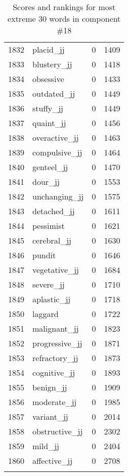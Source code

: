 \begin{longtable}[!htbp]{| rlr@{.}l |}
    1832 & placid\_jj & 0 & 1409 \\
    1833 & blustery\_jj & 0 & 1418 \\
    1834 & obsessive & 0 & 1433 \\
    1835 & outdated\_jj & 0 & 1449 \\
    1836 & stuffy\_jj & 0 & 1449 \\
    1837 & quaint\_jj & 0 & 1456 \\
    1838 & overactive\_jj & 0 & 1463 \\
    1839 & compulsive\_jj & 0 & 1464 \\
    1840 & genteel\_jj & 0 & 1470 \\
    1841 & dour\_jj & 0 & 1553 \\
    1842 & unchanging\_jj & 0 & 1575 \\
    1843 & detached\_jj & 0 & 1611 \\
    1844 & pessimist & 0 & 1621 \\
    1845 & cerebral\_jj & 0 & 1630 \\
    1846 & pundit & 0 & 1646 \\
    1847 & vegetative\_jj & 0 & 1684 \\
    1848 & severe\_jj & 0 & 1710 \\
    1849 & aplastic\_jj & 0 & 1718 \\
    1850 & laggard & 0 & 1722 \\
    1851 & malignant\_jj & 0 & 1823 \\
    1852 & progressive\_jj & 0 & 1871 \\
    1853 & refractory\_jj & 0 & 1873 \\
    1854 & cognitive\_jj & 0 & 1893 \\
    1855 & benign\_jj & 0 & 1909 \\
    1856 & moderate\_jj & 0 & 1985 \\
    1857 & variant\_jj & 0 & 2014 \\
    1858 & obstructive\_jj & 0 & 2302 \\
    1859 & mild\_jj & 0 & 2404 \\
    1860 & affective\_jj & 0 & 2708 \\
    \hline
    \caption{Scores and rankings for most extreme 30 words in component \#18} \\
\end{longtable}
